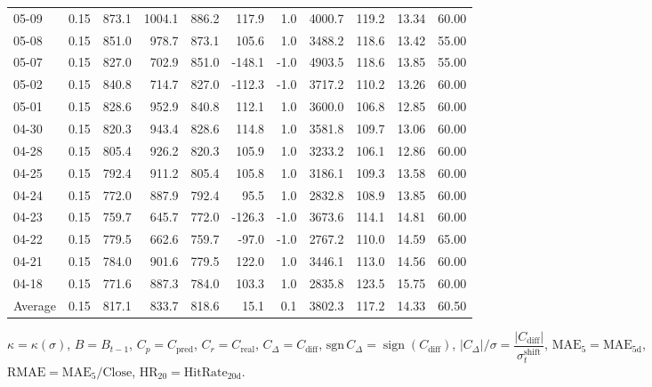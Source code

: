 \begin{threeparttable}
{\begin{tabular}{lrrrrrrrrrr}
05-09 & 0.15 & 873.1 & 1004.1 & 886.2 & 117.9 & 1.0 & 4000.7 & 119.2 & 13.34 & 60.00 \\
05-08 & 0.15 & 851.0 & 978.7 & 873.1 & 105.6 & 1.0 & 3488.2 & 118.6 & 13.42 & 55.00 \\
05-07 & 0.15 & 827.0 & 702.9 & 851.0 & -148.1 & -1.0 & 4903.5 & 118.6 & 13.85 & 55.00 \\
05-02 & 0.15 & 840.8 & 714.7 & 827.0 & -112.3 & -1.0 & 3717.2 & 110.2 & 13.26 & 60.00 \\
05-01 & 0.15 & 828.6 & 952.9 & 840.8 & 112.1 & 1.0 & 3600.0 & 106.8 & 12.85 & 60.00 \\
04-30 & 0.15 & 820.3 & 943.4 & 828.6 & 114.8 & 1.0 & 3581.8 & 109.7 & 13.06 & 60.00 \\
04-28 & 0.15 & 805.4 & 926.2 & 820.3 & 105.9 & 1.0 & 3233.2 & 106.1 & 12.86 & 60.00 \\
04-25 & 0.15 & 792.4 & 911.2 & 805.4 & 105.8 & 1.0 & 3186.1 & 109.3 & 13.58 & 60.00 \\
04-24 & 0.15 & 772.0 & 887.9 & 792.4 & 95.5 & 1.0 & 2832.8 & 108.9 & 13.85 & 60.00 \\
04-23 & 0.15 & 759.7 & 645.7 & 772.0 & -126.3 & -1.0 & 3673.6 & 114.1 & 14.81 & 60.00 \\
04-22 & 0.15 & 779.5 & 662.6 & 759.7 & -97.0 & -1.0 & 2767.2 & 110.0 & 14.59 & 65.00 \\
04-21 & 0.15 & 784.0 & 901.6 & 779.5 & 122.0 & 1.0 & 3446.1 & 113.0 & 14.56 & 60.00 \\
04-18 & 0.15 & 771.6 & 887.3 & 784.0 & 103.3 & 1.0 & 2835.8 & 123.5 & 15.75 & 60.00 \\
Average & 0.15 & 817.1 & 833.7 & 818.6 & 15.1 & 0.1 & 3802.3 & 117.2 & 14.33 & 60.50 \\
\bottomrule
\end{tabular}
}%
\begin{tablenotes}\footnotesize
\item $\kappa=\kappa(\sigma)$, $B=B_{t-1}$, $C_p=C_{\text{pred}}$, $C_r=C_{\text{real}}$, $C_\Delta=C_{\text{diff}}$, $\mathrm{sgn}\,C_\Delta=\operatorname{sign}(C_{\text{diff}})$, $|C_\Delta|/\sigma=\dfrac{|C_{\text{diff}}|}{\sigma_t^{\text{shift}}}$, $\mathrm{MAE}_5=\mathrm{MAE}_{5\text{d}}$, $\mathrm{RMAE}= \mathrm{MAE}_5 / \text{Close}$, $\mathrm{HR}_{20}=\mathrm{HitRate}_{20\text{d}}$.
\end{tablenotes}
\end{threeparttable}
\endgroup